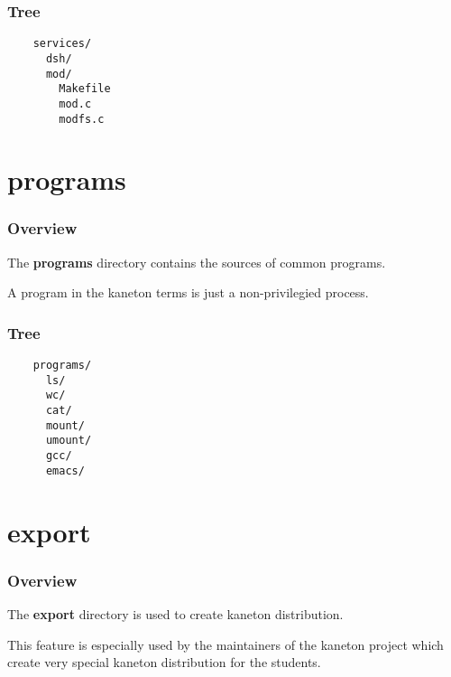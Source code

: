 
\begin{frame}[containsverbatim]
  \frametitle{Tree}

  \begin{verbatim}
    services/
      dsh/
      mod/
        Makefile
        mod.c
        modfs.c
  \end{verbatim}
\end{frame}

%
%

\section{programs}


\begin{frame}
  \frametitle{Overview}

  The \textbf{programs} directory contains the sources of common
  programs.

  \nl

  A program in the kaneton terms is just a non-privilegied
  process.
\end{frame}


\begin{frame}[containsverbatim]
  \frametitle{Tree}

  \begin{verbatim}
    programs/
      ls/
      wc/
      cat/
      mount/
      umount/
      gcc/
      emacs/
  \end{verbatim}
\end{frame}

%
%

\section{export}


\begin{frame}
  \frametitle{Overview}

  The \textbf{export} directory is used to create kaneton distribution.

  \nl

  This feature is especially used by the maintainers of the kaneton
  project which create very special kaneton distribution for
  the students.
\end{frame}


